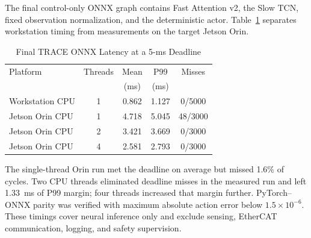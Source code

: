 The final control-only ONNX graph contains Fast Attention v2, the Slow TCN, fixed observation normalization, and the deterministic actor. Table~\ref{tab:deployment_latency} separates workstation timing from measurements on the target Jetson Orin.

\begin{table}[t]
\centering
\caption{Final TRACE ONNX Latency at a 5-ms Deadline}
\label{tab:deployment_latency}
\footnotesize
\begin{tabular}{@{}lcccc@{}}
\toprule
Platform & Threads & Mean & P99 & Misses \\
& & (ms) & (ms) & \\
\midrule
Workstation CPU & 1 & 0.862 & 1.127 & 0/5000 \\
Jetson Orin CPU & 1 & 4.718 & 5.045 & 48/3000 \\
Jetson Orin CPU & 2 & 3.421 & 3.669 & 0/3000 \\
Jetson Orin CPU & 4 & 2.581 & 2.793 & 0/3000 \\
\bottomrule
\end{tabular}
\end{table}

The single-thread Orin run met the deadline on average but missed 1.6\% of cycles. Two CPU threads eliminated deadline misses in the measured run and left 1.33~ms of P99 margin; four threads increased that margin further. PyTorch--ONNX parity was verified with maximum absolute action error below $1.5\times10^{-6}$. These timings cover neural inference only and exclude sensing, EtherCAT communication, logging, and safety supervision.
